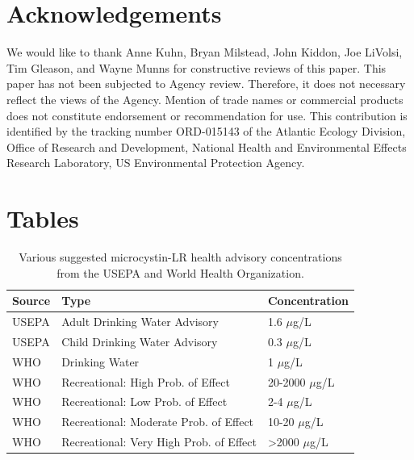 \documentclass[10pt,a4paper,twocolumn]{article}
\begin{document}
\section{Acknowledgements}\label{acknowledgements}

We would like to thank Anne Kuhn, Bryan Milstead, John Kiddon, Joe
LiVolsi, Tim Gleason, and Wayne Munns for constructive reviews of this
paper. This paper has not been subjected to Agency review. Therefore, it
does not necessary reflect the views of the Agency. Mention of trade
names or commercial products does not constitute endorsement or
recommendation for use. This contribution is identified by the tracking
number ORD-015143 of the Atlantic Ecology Division, Office of Research
and Development, National Health and Environmental Effects Research
Laboratory, US Environmental Protection Agency.

\onecolumn

\section{Tables}\label{tables}

\begin{table}[ht]
\caption{Various suggested microcystin-LR health advisory 
                     concentrations from the USEPA and World Health Organization.} 
\label{microcystin_levels}
\begin{tabular}{lll}
  \hline
Source & Type & Concentration \\ 
  \hline
USEPA & Adult Drinking Water Advisory & 1.6 $\mu$g/L \\ 
  USEPA & Child Drinking Water Advisory & 0.3 $\mu$g/L \\ 
  WHO & Drinking Water & 1 $\mu$g/L \\ 
  WHO & Recreational: High Prob. of Effect & 20-2000 $\mu$g/L \\ 
  WHO & Recreational: Low Prob. of Effect & 2-4 $\mu$g/L \\ 
  WHO & Recreational: Moderate Prob. of Effect & 10-20 $\mu$g/L \\ 
  WHO & Recreational: Very High Prob. of Effect & >2000 $\mu$g/L \\ 
   \hline
\end{tabular}
\end{table}
\end{document}
